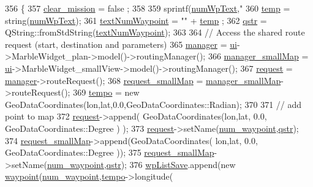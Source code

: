 \begin{DoxyCode}
356                                                                 \{
357     \hyperlink{a00008_a4ea0f7bc01af5b4359d7be6998600e13}{clear\_mission} = false ;
358 
359   sprintf(\hyperlink{a00008_aad93f0b04d6ea6ac097124ef453bef9d}{numWpText},\textcolor{stringliteral}{"%
360   \hyperlink{a00008_a57c52213e1c32a667a5963a122e0a23b}{temp} = string(\hyperlink{a00008_aad93f0b04d6ea6ac097124ef453bef9d}{numWpText});
361   \hyperlink{a00008_aa6011e6576184fcd9e0841fdffbaa826}{textNumWaypoint} = \textcolor{stringliteral}{""} + \hyperlink{a00008_a57c52213e1c32a667a5963a122e0a23b}{temp} ;
362   \hyperlink{a00008_add3cc0473ea4a2ff453620e16ac24056}{qstr} = QString::fromStdString(\hyperlink{a00008_aa6011e6576184fcd9e0841fdffbaa826}{textNumWaypoint});
363 
364   \textcolor{comment}{// Access the shared route request (start, destination and parameters)}
365   \hyperlink{a00008_a02d3f124c170b0126dab54f6e5a18dae}{manager} = \hyperlink{a00008_a6dc041ef6a2ffb329928d2913e8344e6}{ui}->MarbleWidget\_plan->model()->routingManager();
366   \hyperlink{a00008_aca10b4dc402bfe3d17f1fcba33544252}{manager\_smallMap} = \hyperlink{a00008_a6dc041ef6a2ffb329928d2913e8344e6}{ui}->MarbleWidget\_smallView->model()->routingManager();
367   \hyperlink{a00008_ade0ea03ae98566eaed4f7a1f331f237a}{request} = \hyperlink{a00008_a02d3f124c170b0126dab54f6e5a18dae}{manager}->routeRequest();
368   \hyperlink{a00008_aeae2fdde26f8ed9003c0cf66a1f25662}{request\_smallMap} = \hyperlink{a00008_aca10b4dc402bfe3d17f1fcba33544252}{manager\_smallMap}->routeRequest();
369   \hyperlink{a00008_a99347d1261cfb39396fdc4965d16f515}{tempo} = \textcolor{keyword}{new} GeoDataCoordinates(lon,lat,0.0,GeoDataCoordinates::Radian);
370 
371  \textcolor{comment}{// add point to map}
372  \hyperlink{a00008_ade0ea03ae98566eaed4f7a1f331f237a}{request}->append( GeoDataCoordinates(lon,lat, 0.0, GeoDataCoordinates::Degree ) );
373  \hyperlink{a00008_ade0ea03ae98566eaed4f7a1f331f237a}{request}->setName(\hyperlink{a00008_ab5b110200d9f08e5d10a2549f54073c9}{num\_waypoint},\hyperlink{a00008_add3cc0473ea4a2ff453620e16ac24056}{qstr});
374  \hyperlink{a00008_aeae2fdde26f8ed9003c0cf66a1f25662}{request\_smallMap}->append(GeoDataCoordinates( lon,lat, 0.0, GeoDataCoordinates::Degree ));
375  \hyperlink{a00008_aeae2fdde26f8ed9003c0cf66a1f25662}{request\_smallMap}->setName(\hyperlink{a00008_ab5b110200d9f08e5d10a2549f54073c9}{num\_waypoint},\hyperlink{a00008_add3cc0473ea4a2ff453620e16ac24056}{qstr});
376  \hyperlink{a00008_ad11e2550a13b49086c06cf1c1dbf0a45}{wpListSave}.append(\textcolor{keyword}{new} \hyperlink{a00016}{waypoint}(\hyperlink{a00008_ab5b110200d9f08e5d10a2549f54073c9}{num\_waypoint},\hyperlink{a00008_a99347d1261cfb39396fdc4965d16f515}{tempo}->longitude(
}
\end{DoxyCode}
